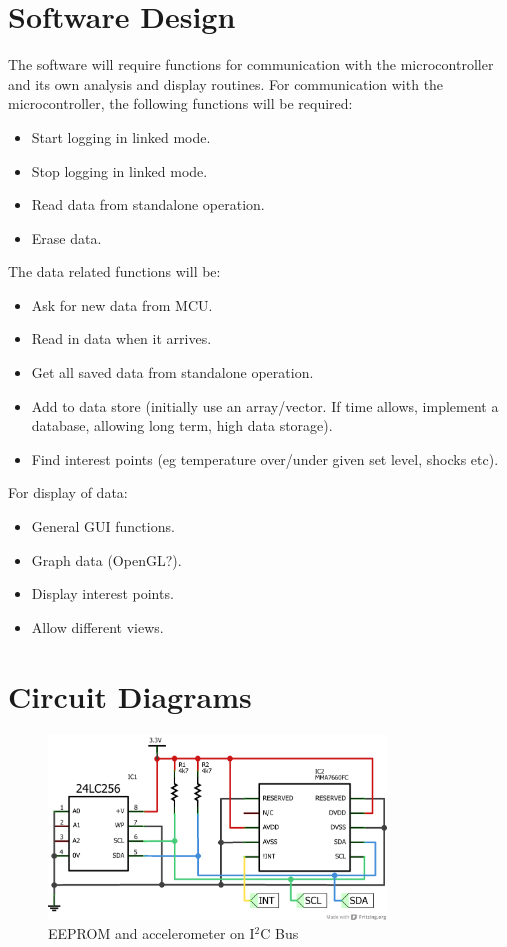 \documentclass[a4paper,11pt]{article}  %
\begin{document}
\section{Software Design}
\label{sec:software-design}

The software will require functions for communication with the
microcontroller and its own analysis and display routines. For
communication with the microcontroller, the following functions
will be required:
\begin{itemize}
  \item Start logging in linked mode.
  \item Stop logging in linked mode.
  \item Read data from standalone operation.
  \item Erase data.
\end{itemize}
The data related functions will be:
\begin{itemize}
  \item Ask for new data from MCU.
  \item Read in data when it arrives.
  \item Get all saved data from standalone operation.
  \item Add to data store (initially use an array/vector. If time
    allows, implement a database, allowing long term, high data
    storage).
  \item Find interest points (eg temperature over/under given set
    level, shocks etc).
\end{itemize}
For display of data:
\begin{itemize}
  \item General GUI functions.
  \item Graph data (OpenGL?).
  \item Display interest points.
  \item Allow different views.
\end{itemize}

\newpage
\appendix

\section{Circuit Diagrams}
\label{sec:circuit-diagrams}

\begin{figure}[!h]
  \begin{center}
    \includegraphics[width=0.8\textwidth]{i2c_schem.png}
  \end{center}
  \caption{EEPROM and accelerometer on I$^2$C Bus}
  \label{fig:i2cbus}
\end{figure}
\end{document}
